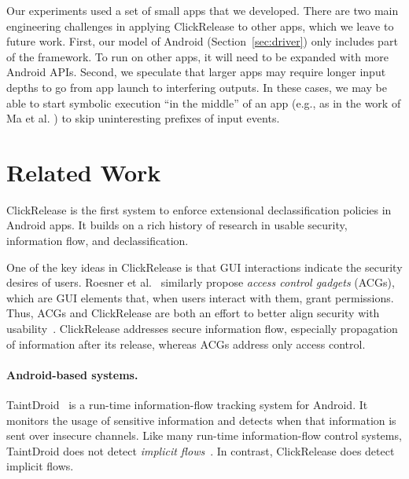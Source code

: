 \documentclass{llncs}
\newcommand{\toolname}{ClickRelease\xspace}
\begin{document}
Our experiments used a set of small apps that we
developed. There are two main engineering challenges in applying
\toolname{} to other apps, which we leave to future work. First, our
model of Android (Section~\ref{sec:driver}) only includes part of the
framework. To run on other apps, it will need to be expanded
with more Android APIs. 
Second, we speculate
that larger apps may require longer input depths to go from app launch
to interfering outputs. In these cases, we may be able to start
symbolic execution ``in the middle'' of an app (e.g., as in the
work of Ma et al. \cite{Ma:2011}) to skip uninteresting
prefixes of input events.

\section{Related Work}
\label{sec:related-work}

\toolname is the first system to enforce extensional declassification policies 
in Android apps.  It builds on a rich history of research in usable security,
information flow, and declassification.

One of the key ideas in \toolname is that GUI interactions indicate the 
security desires of users.
Roesner et al.~\cite{Roesner:12} similarly propose \emph{access control gadgets}
(ACGs), which are GUI elements that, when users interact with them,
grant permissions. 
Thus, ACGs and \toolname{} are both an effort to better align 
security with usability~\cite{Yee:04}.
\toolname addresses secure information flow, especially propagation of
information after its release, whereas ACGs address only access control.

\paragraph*{Android-based systems.}

TaintDroid~\cite{Enck:10} is a run-time information-flow tracking system
for Android.  It monitors the usage of sensitive information and detects
when that information is sent over insecure channels.
Like many run-time information-flow control systems,
TaintDroid does not detect \emph{implicit flows}~\cite{King:08}. In contrast,
\toolname does detect implicit flows.
\end{document}
